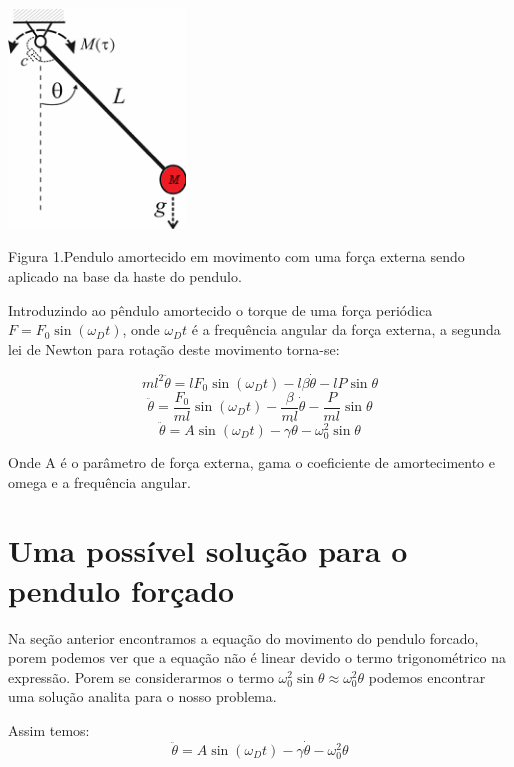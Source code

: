 \documentclass[dvipsnames,a4paper,12pt]{article}
\begin{document}
\begin{center}
	\includegraphics[width=1.85in,height=2.30in,keepaspectratio = false]{nonlinear-pendulum.png}
	
	\scriptsize Figura 1.Pendulo amortecido em movimento com uma força externa sendo aplicado na base da haste do pendulo. 
	
\end{center}

Introduzindo ao pêndulo amortecido o torque de uma força periódica $F = F_0\sin(\omega_D{t})$, onde $\omega_D{t}$ é a frequência angular da força externa, a segunda lei de Newton para rotação deste movimento torna-se:

\[	ml^2\ddot{\theta} = lF_0\sin(\omega_D{t}) -l\beta\dot{\theta} -lP\sin\theta \]
\[\ddot{\theta} = \frac{F_0}{ml}\sin(\omega_D{t}) - \frac{\beta}{ml}\dot{\theta} -\frac{P}{ml}\sin\theta\]
\begin{equation}
	\ddot{\theta} = A\sin(\omega_D{t}) -\gamma\dot{\theta} -\omega_{0}^2\sin\theta
\end{equation}

Onde A é o parâmetro de força externa, gama o coeficiente de amortecimento e omega e a frequência angular.

\section{Uma possível solução para o pendulo forçado}

Na seção anterior encontramos a equação do movimento do pendulo forcado, porem podemos ver que a equação não é linear devido o termo trigonométrico na expressão. Porem se considerarmos o termo $\omega_{0}^2\sin\theta \approx \omega_{0}^2\theta$ podemos encontrar uma solução analita para o nosso problema.

Assim temos:
\begin{equation}
\ddot{\theta} = A\sin(\omega_D{t}) -\gamma\dot{\theta} -\omega_{0}^2\theta
\end{equation}
\end{document}
